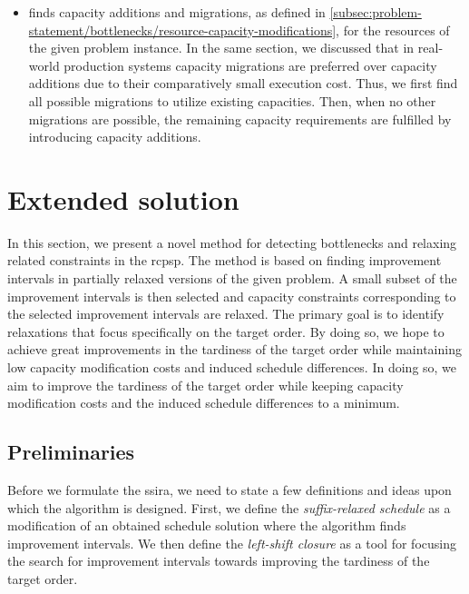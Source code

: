 \begin{itemize}
    \item {}
        finds capacity additions and migrations,
        as defined in \cref{subsec:problem-statement/bottlenecks/resource-capacity-modifications},
        for the resources of the given problem instance.
        In the same section,
        we discussed that in real-world production systems
        capacity migrations are preferred over capacity additions due to their comparatively small execution cost.
        Thus, we first find all possible migrations to utilize existing capacities.
        Then, when no other migrations are possible, the remaining capacity requirements are fulfilled
        by introducing capacity additions.
\end{itemize}

\section{Extended solution} \label{sec:solution-apporach/extended-solution}

In this section, we present a novel method for detecting bottlenecks
and relaxing related constraints in the \ac{rcpsp}.
The method is based on finding improvement intervals
in partially relaxed versions of the given problem.
A small subset of the improvement intervals is then selected and capacity constraints
corresponding to the selected improvement intervals are relaxed.
The primary goal is to identify relaxations that focus specifically on the target order.
By doing so, we hope to achieve great improvements in the tardiness of the target order
while maintaining low capacity modification costs and induced schedule differences.
In doing so, we aim to improve the tardiness of the target order
while keeping capacity modification costs and the induced schedule differences to a minimum.

\subsection{Preliminaries} \label{subsec:solution-approach/extended-solutin/preliminaries}

Before we formulate the \acl{ssira},
we need to state a few definitions and ideas upon which the algorithm is designed.
First, we define the \emph{suffix-relaxed schedule} as a modification of an obtained schedule solution
where the algorithm finds improvement intervals.
We then define the \emph{left-shift closure} as a tool
for focusing the search for improvement intervals towards improving the tardiness of the target order.

